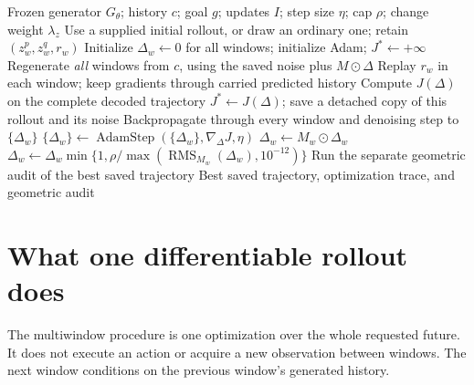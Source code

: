 \documentclass[10pt]{article}
\newcommand{\rms}{\operatorname{RMS}}
\begin{document}
\begin{algorithm}[H]
\caption{Current complete-rollout initial-noise optimization}
\begin{algorithmic}[1]
\REQUIRE Frozen generator $G_\theta$; history $c$; goal $g$; updates $I$;
step size $\eta$; cap $\rho$; change weight $\lambda_z$
\STATE Use a supplied initial rollout, or draw an ordinary one; retain $(z_w^p,z_w^q,r_w)$
\STATE Initialize $\Delta_w\gets0$ for all windows; initialize Adam; $J^*\gets+\infty$
  \STATE Regenerate \emph{all} windows from $c$, using the saved noise plus $M\odot\Delta$
  \STATE Replay $r_w$ in each window; keep gradients through carried predicted history
  \STATE Compute $J(\Delta)$ on the complete decoded trajectory
    \STATE $J^*\gets J(\Delta)$; save a detached copy of this rollout and its noise
  \ENDIF
    \STATE Backpropagate through every window and denoising step to $\{\Delta_w\}$
    \STATE $\{\Delta_w\}\gets\operatorname{AdamStep}(\{\Delta_w\},\nabla_\Delta J,\eta)$
      \STATE $\Delta_w\gets M_w\odot\Delta_w$
      \STATE $\Delta_w\gets\Delta_w\min\{1,\rho/\max(\rms_{M_w}(\Delta_w),10^{-12})\}$
    \ENDFOR
  \ENDIF
\ENDFOR
\STATE Run the separate geometric audit of the best saved trajectory
\RETURN Best saved trajectory, optimization trace, and geometric audit
\end{algorithmic}
\end{algorithm}

\clearpage
\section{What one differentiable rollout does}
The multiwindow procedure is one optimization over the whole requested future.
It does not execute an action or acquire a new observation between windows.
The next window conditions on the previous window's generated history.
\end{document}
